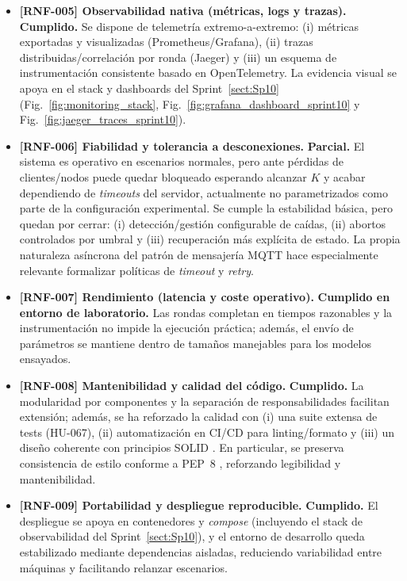 \documentclass{report}
\begin{document}
\begin{itemize}
  \item \textbf{[RNF-005] Observabilidad nativa (métricas, logs y trazas).} \textbf{Cumplido.}  
  Se dispone de telemetría extremo-a-extremo: (i) métricas exportadas y visualizadas (Prometheus/Grafana), (ii) trazas distribuidas/correlación por ronda (Jaeger) y (iii) un esquema de instrumentación consistente basado en OpenTelemetry. La evidencia visual se apoya en el stack y dashboards del Sprint~\ref{sect:Sp10} (Fig.~\ref{fig:monitoring_stack}, Fig.~\ref{fig:grafana_dashboard_sprint10} y Fig.~\ref{fig:jaeger_traces_sprint10}).

  \item \textbf{[RNF-006] Fiabilidad y tolerancia a desconexiones.} \textbf{Parcial.}  
  El sistema es operativo en escenarios normales, pero ante pérdidas de clientes/nodos puede quedar bloqueado esperando alcanzar $K$ y acabar dependiendo de \textit{timeouts} del servidor, actualmente no parametrizados como parte de la configuración experimental. Se cumple la estabilidad básica, pero quedan por cerrar: (i) detección/gestión configurable de caídas, (ii) abortos controlados por umbral y (iii) recuperación más explícita de estado. La propia naturaleza asíncrona del patrón de mensajería MQTT hace especialmente relevante formalizar políticas de \textit{timeout} y \textit{retry}.

  \item \textbf{[RNF-007] Rendimiento (latencia y coste operativo).} \textbf{Cumplido en entorno de laboratorio.}  
  Las rondas completan en tiempos razonables y la instrumentación no impide la ejecución práctica; además, el envío de parámetros se mantiene dentro de tamaños manejables para los modelos ensayados. 

  \item \textbf{[RNF-008] Mantenibilidad y calidad del código.} \textbf{Cumplido.}  
  La modularidad por componentes y la separación de responsabilidades facilitan extensión; además, se ha reforzado la calidad con (i) una suite extensa de tests (HU-067), (ii) automatización en CI/CD para linting/formato y (iii) un diseño coherente con principios SOLID \cite{martin2008clean}. En particular, se preserva consistencia de estilo conforme a PEP~8 \cite{pep8}, reforzando legibilidad y mantenibilidad.

  \item \textbf{[RNF-009] Portabilidad y despliegue reproducible.} \textbf{Cumplido.}  
  El despliegue se apoya en contenedores y \textit{compose} (incluyendo el stack de observabilidad del Sprint~\ref{sect:Sp10}), y el entorno de desarrollo queda estabilizado mediante dependencias aisladas, reduciendo variabilidad entre máquinas y facilitando relanzar escenarios.


\end{itemize}
\end{document}
